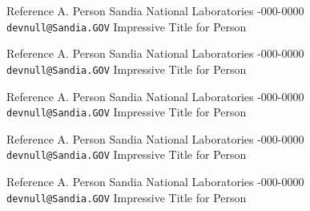 \documentclass[margin,line,11pt,draft]{res}
\begin{document}
\begin{resume}
{%
Reference A. Person \newline
Sandia National Laboratories -000-0000 \newline
{\tt devnull@Sandia.GOV} \newline
Impressive Title for Person



%
Reference A. Person \newline
Sandia National Laboratories -000-0000 \newline
{\tt devnull@Sandia.GOV} \newline
Impressive Title for Person



%
Reference A. Person \newline
Sandia National Laboratories -000-0000 \newline
{\tt devnull@Sandia.GOV} \newline
Impressive Title for Person



%
Reference A. Person \newline
Sandia National Laboratories -000-0000 \newline
{\tt devnull@Sandia.GOV} \newline
Impressive Title for Person



%
Reference A. Person \newline
Sandia National Laboratories -000-0000 \newline
{\tt devnull@Sandia.GOV} \newline
Impressive Title for Person



}


\end{resume}
\end{document}
